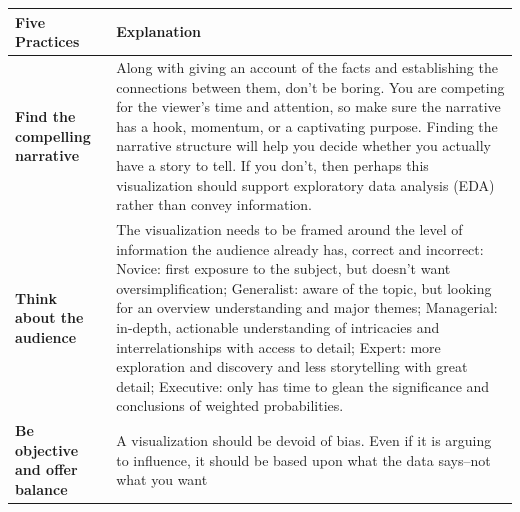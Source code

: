 \documentclass[]{book}
\begin{document}
\begin{longtable}[]{@{}ll@{}}
\toprule
\begin{minipage}[b]{0.19\columnwidth}\raggedright\strut
\textbf{Five Practices}\strut
\end{minipage} & \begin{minipage}[b]{0.75\columnwidth}\raggedright\strut
\textbf{Explanation}\strut
\end{minipage}\tabularnewline
\midrule
\endhead
\begin{minipage}[t]{0.19\columnwidth}\raggedright\strut
\textbf{Find the compelling narrative}\strut
\end{minipage} & \begin{minipage}[t]{0.75\columnwidth}\raggedright\strut
Along with giving an account of the facts and establishing the
connections between them, don't be boring. You are competing for the
viewer's time and attention, so make sure the narrative has a hook,
momentum, or a captivating purpose. Finding the narrative structure will
help you decide whether you actually have a story to tell. If you don't,
then perhaps this visualization should support exploratory data analysis
(EDA) rather than convey information.\strut
\end{minipage}\tabularnewline
\begin{minipage}[t]{0.19\columnwidth}\raggedright\strut
\textbf{Think about the audience}\strut
\end{minipage} & \begin{minipage}[t]{0.75\columnwidth}\raggedright\strut
The visualization needs to be framed around the level of information the
audience already has, correct and incorrect: Novice: first exposure to
the subject, but doesn't want oversimplification; Generalist: aware of
the topic, but looking for an overview understanding and major themes;
Managerial: in-depth, actionable understanding of intricacies and
interrelationships with access to detail; Expert: more exploration and
discovery and less storytelling with great detail; Executive: only has
time to glean the significance and conclusions of weighted
probabilities.\strut
\end{minipage}\tabularnewline
\begin{minipage}[t]{0.19\columnwidth}\raggedright\strut
\textbf{Be objective and offer balance}\strut
\end{minipage} & \begin{minipage}[t]{0.75\columnwidth}\raggedright\strut
A visualization should be devoid of bias. Even if it is arguing to
influence, it should be based upon what the data says--not what you want

\end{minipage}
\end{longtable}
\end{document}
